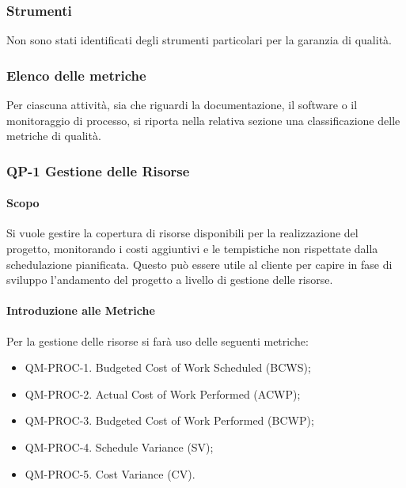 	\subsubsection{Strumenti}

	Non sono stati identificati degli strumenti particolari per la garanzia di qualità.





	\subsubsection{Elenco delle metriche}

		Per ciascuna attività, sia che riguardi la documentazione, il software o il monitoraggio di processo, si riporta nella relativa sezione una classificazione delle metriche di qualità.

		\subsubsection{QP-1 Gestione delle Risorse}

			\paragraph{Scopo}

			Si vuole gestire la copertura di risorse disponibili per la realizzazione del progetto, monitorando i costi aggiuntivi e le tempistiche non rispettate dalla schedulazione pianificata. Questo può essere utile al cliente per capire in fase di sviluppo l'andamento del progetto a livello di gestione delle risorse.

			\paragraph{Introduzione alle Metriche}

			Per la gestione delle risorse si farà uso delle seguenti metriche:

			\begin{itemize}
				\item QM-PROC-1. Budgeted Cost of Work Scheduled (BCWS);
				\item QM-PROC-2. Actual Cost of Work Performed (ACWP);
				\item QM-PROC-3. Budgeted Cost of Work Performed (BCWP);
				\item QM-PROC-4. Schedule Variance (SV);
				\item QM-PROC-5. Cost Variance (CV).
			\end{itemize}

